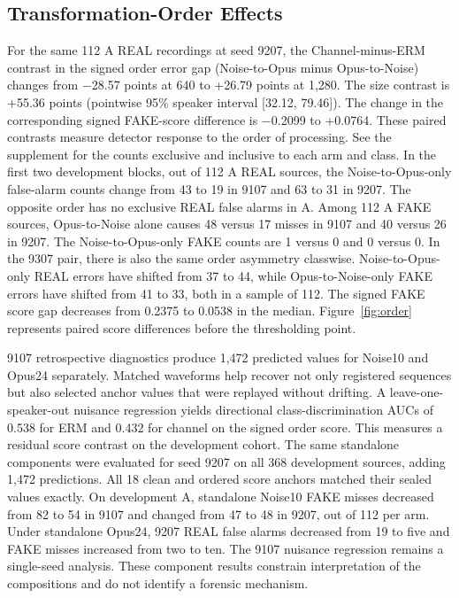 \subsection{Transformation-Order Effects}

For the same 112 A REAL recordings at seed 9207, the Channel-minus-ERM contrast in the signed order error gap (Noise-to-Opus minus Opus-to-Noise) changes from \ensuremath{-}28.57 points at 640 to +26.79 points at 1,280. The size contrast is +55.36 points (pointwise 95\% speaker interval [32.12, 79.46]). The change in the corresponding signed FAKE-score difference is \ensuremath{-}0.2099 to +0.0764. These paired contrasts measure detector response to the order of processing. See the supplement for the counts exclusive and inclusive to each arm and class. In the first two development blocks, out of 112 A REAL sources, the Noise-to-Opus-only false-alarm counts change from 43 to 19 in 9107 and 63 to 31 in 9207. The opposite order has no exclusive REAL false alarms in A. Among 112 A FAKE sources, Opus-to-Noise alone causes 48 versus 17 misses in 9107 and 40 versus 26 in 9207. The Noise-to-Opus-only FAKE counts are 1 versus 0 and 0 versus 0. In the 9307 pair, there is also the same order asymmetry classwise. Noise-to-Opus-only REAL errors have shifted from 37 to 44, while Opus-to-Noise-only FAKE errors have shifted from 41 to 33, both in a sample of 112. The signed FAKE score gap decreases from 0.2375 to 0.0538 in the median. Figure~\ref{fig:order} represents paired score differences before the thresholding point.

9107 retrospective diagnostics produce 1,472 predicted values for Noise10 and Opus24 separately. Matched waveforms help recover not only registered sequences but also selected anchor values that were replayed without drifting. A leave-one-speaker-out nuisance regression yields directional class-discrimination AUCs of 0.538 for ERM and 0.432 for channel on the signed order score. This measures a residual score contrast on the development cohort. The same standalone components were evaluated for seed 9207 on all 368 development sources, adding 1,472 predictions. All 18 clean and ordered score anchors matched their sealed values exactly. On development A, standalone Noise10 FAKE misses decreased from 82 to 54 in 9107 and changed from 47 to 48 in 9207, out of 112 per arm. Under standalone Opus24, 9207 REAL false alarms decreased from 19 to five and FAKE misses increased from two to ten. The 9107 nuisance regression remains a single-seed analysis. These component results constrain interpretation of the compositions and do not identify a forensic mechanism.

